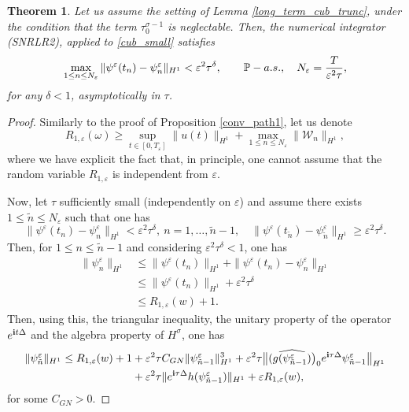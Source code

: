 \documentclass[10pt,a4paper]{amsart}
\newtheorem{theorem}{Theorem}
\begin{document}
\begin{theorem}
\label{long_term_path_orig_cub}
    Let us assume the setting of Lemma \ref{long_term_cub_trunc}, under the condition that the term $\tau_0^{\sigma-1}$ is neglectable. Then, the numerical integrator (SNRLR2), applied to \eqref{cub_small} satisfies 
    $$
    \max_{1\le n \le N_\varepsilon}\| \psi^\varepsilon(t_n)-\psi^\varepsilon_n\|_{H^1}<\varepsilon^2\tau^\delta, \qquad \mathbb{P}-{\rm a.s.}, \quad N_\varepsilon=\frac{T}{\varepsilon^2 \tau},
    $$
    for any $\delta<1$, asymptotically in $\tau$.
\end{theorem}

\begin{proof}
    Similarly to the proof of Proposition \ref{conv_path1}, let us denote
$$
R_{1,\varepsilon}(\omega)\ge \sup_{t\in[0,T_\varepsilon]} \|u(t)\|_{H^1}+\max_{1\le n\le N_\varepsilon} \|\mathcal{W}_n\|_{H^1},
$$
where we have explicit the fact that, in principle, one cannot assume that the random variable $R_{1,\varepsilon}$ is independent from $\varepsilon$.

     Now, let $\tau$ sufficiently small (independently on $\varepsilon$) and assume there exists $1\le \tilde{n}\le N_\varepsilon$ such that one has
     $$
         \|\psi^\varepsilon (t_n)-\psi^\varepsilon_{n}\|_{H^1}<\varepsilon^2 \tau^\delta, \ n=1,\dots,\tilde{n}-1, \quad \|\psi^\varepsilon (t_{\tilde{n}})-\psi^\varepsilon_{\tilde{n}}\|_{H^1}\ge \varepsilon^2 \tau^\delta.
     $$
     Then, for $1\le n\le \tilde{n}-1$ and considering $\varepsilon^2 \tau^\delta<1$, one has
     \begin{align*}
         \|\psi^\varepsilon_n\|_{H^1}&\le \|\psi^\varepsilon(t_n)\|_{H^1}+\|\psi^\varepsilon(t_n)-\psi^\varepsilon_n\|_{H^1}\\
         &\le \|\psi^\varepsilon(t_n)\|_{H^1}+\varepsilon^2 \tau^\delta\\
         &\le R_{1,\varepsilon}(w)+1.
     \end{align*}
     Then, using this, the triangular inequality, the unitary property of the operator ${\rm e}^{{\bf i}t\Delta}$ and the algebra property of $H^\sigma$, one has
     \begin{align*}
         \|\psi^\varepsilon_{\tilde{n}}\|_{H^1}\le R_{1,\varepsilon}(w)+1&+\varepsilon^2\tau C_{GN} \|\psi^\varepsilon_{\tilde{n}-1}\|^3_{H^1}
         +\varepsilon^2 \tau \big\| (\widehat{g(\psi^\varepsilon_{\tilde{n}-1})}\big)_0 {\rm e}^{{\bf i} \tau \Delta} \psi^\varepsilon_{\tilde{n}-1}\big\|_{H^1}\\
         &+\varepsilon^2 \tau \|{\rm e}^{{\bf i}\tau \Delta} h(\psi^\varepsilon_{\tilde{n}-1})\|_{H^1}+\varepsilon R_{1,\varepsilon}(w),
     \end{align*}
     for some $C_{GN}>0$.


\end{proof}
\end{document}
